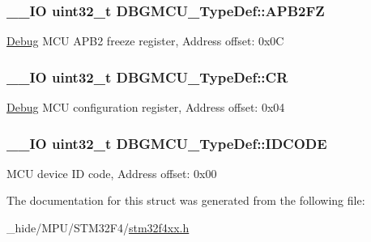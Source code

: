 \subsubsection[{A\+P\+B2\+F\+Z}]{\setlength{\rightskip}{0pt plus 5cm}\+\_\+\+\_\+\+I\+O uint32\+\_\+t D\+B\+G\+M\+C\+U\+\_\+\+Type\+Def\+::\+A\+P\+B2\+F\+Z}\label{struct_d_b_g_m_c_u___type_def_a011f892d86367dbe786964b14bc515a6}
\hyperlink{class_debug}{Debug} M\+C\+U A\+P\+B2 freeze register, Address offset\+: 0x0\+C \hypertarget{struct_d_b_g_m_c_u___type_def_a15981828f2b915d38570cf6684e99a53}{}
\subsubsection[{C\+R}]{\setlength{\rightskip}{0pt plus 5cm}\+\_\+\+\_\+\+I\+O uint32\+\_\+t D\+B\+G\+M\+C\+U\+\_\+\+Type\+Def\+::\+C\+R}\label{struct_d_b_g_m_c_u___type_def_a15981828f2b915d38570cf6684e99a53}
\hyperlink{class_debug}{Debug} M\+C\+U configuration register, Address offset\+: 0x04 \hypertarget{struct_d_b_g_m_c_u___type_def_a0cc3561c124d06bb57dfa855e43ed99f}{}
\subsubsection[{I\+D\+C\+O\+D\+E}]{\setlength{\rightskip}{0pt plus 5cm}\+\_\+\+\_\+\+I\+O uint32\+\_\+t D\+B\+G\+M\+C\+U\+\_\+\+Type\+Def\+::\+I\+D\+C\+O\+D\+E}\label{struct_d_b_g_m_c_u___type_def_a0cc3561c124d06bb57dfa855e43ed99f}
M\+C\+U device I\+D code, Address offset\+: 0x00 

The documentation for this struct was generated from the following file\+:\begin{DoxyCompactItemize}
\item 
\+\_\+hide/\+M\+P\+U/\+S\+T\+M32\+F4/\hyperlink{stm32f4xx_8h}{stm32f4xx.\+h}\end{DoxyCompactItemize}
